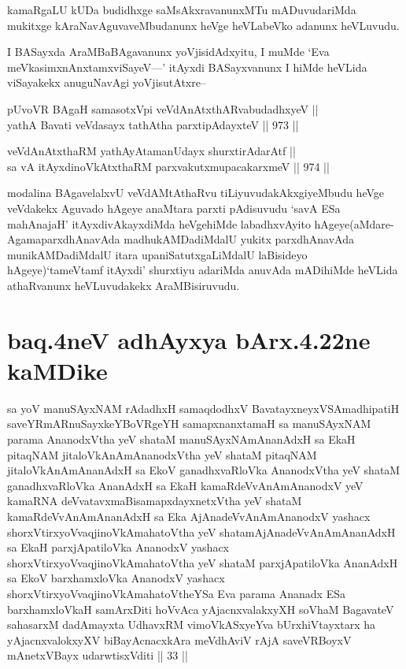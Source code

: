 \begin{artha}
kamaRgaLU kUDa budidhxge saMsAkxravanunxMTu mADuvudariMda mukitxge kAraNavAguvaveMbudanunx heVge heVLabeVko adanunx heVLuvudu.
\end{artha}

\begin{artha}
I BASayxda AraMBaBAgavanunx yoVjisidAdxyitu, I muMde `Eva meVkasimxnAnxtamxviSayeV---' itAyxdi BASayxvanunx I hiMde heVLida viSayakekx anuguNavAgi yoVjisutAtxre--
\end{artha}

\begin{shl}
pUvoVR BAgaH samasotxV\s pi veVdAnAtxthARvabudadhxyeV || \\
yathA Bavati veVdasayx tathA\s tha parxtipAdayxteV ||  973 ||  
\end{shl}
				
\begin{shl}
veVdAnAtxthaRM yathAyAtamanUdayx shurxtirAdarAtf || \\
sa vA itAyxdinoVkAtxthaRM parxvakutxmupacakarxmeV ||  974 ||  
\end{shl}


\begin{artha}
modalina BAgavelalxvU veVdAMtAthaRvu tiLiyuvudakAkxgiyeMbudu heVge veVdakekx Aguvado hAgeye anaMtara parxti pAdisuvudu `savA ESa mahAnajaH' itAyxdivAkayxdiMda heVgehiMde labadhxvAyito hAgeye(aMdare- AgamaparxdhAnavAda madhukAMDadiMdalU yukitx parxdhAnavAda munikAMDadiMdalU itara upaniSatutxgaLiMdalU laBisideyo hAgeye)`tameVtamf itAyxdi' shurxtiyu adariMda anuvAda mADihiMde heVLida athaRvanunx heVLuvudakekx AraMBisiruvudu.
\end{artha}

\section*{baq.4neV adhAyxya bArx.4.22ne kaMDike}

\begin{shl}
sa yoV manuSAyxNAM rAdadhxH samaqdodhxV BavatayxneyxVSAmadhipatiH saveYRmARnuSayxkeYBoVRgeYH samapxnanxtamaH sa manuSAyxNAM parama AnanodxV\s tha yeV shataM manuSAyxNAmAnanAdxH sa EkaH pitaqNAM jitaloVkAnAmAnanodxV\s tha yeV shataM pitaqNAM jitaloVkAnAmAnanAdxH sa EkoV ganadhxvaRloVka AnanodxV\s tha yeV shataM ganadhxvaRloVka AnanAdxH sa EkaH kamaRdeVvAnAmAnanodxV yeV kamaRNA deVvatavxmaBisamapxdayxnetxV\s tha yeV shataM kamaRdeVvAnAmAnanAdxH sa Eka AjAnadeVvAnAmAnanodxV yashacx shorxVtirxyoV\s vaqjinoV\s kAmahatoV\s tha yeV shatamAjAnadeVvAnAmAnanAdxH sa EkaH parxjApatiloVka AnanodxV yashacx shorxVtirxyoV\s vaqjinoV\s kAmahatoV\s tha yeV shataM parxjApatiloVka AnanAdxH sa EkoV barxhamxloVka AnanodxV yashacx shorxVtirxyoV\s vaqjinoV\s kAmahatoV\s theYSa Eva parama Ananadx ESa barxhamxloVkaH samArxDiti hoVvAca yAjacnxvalakxyXH soVhaM BagavateV sahasarxM dadAmayxta UdhavxRM vimoVkASxyeYva bUrxhiVtayxtarx ha yAjacnxvalokxyXV biBayAcnacxkAra meVdhAviV rAjA saveVRBoyxV mAnetxVBayx udarwtisxVditi || 33 ||
\end{shl}

